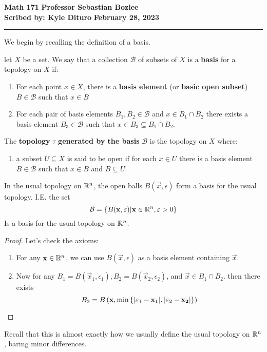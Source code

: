 \documentclass[12pt, twosided]{article}
\begin{document}
\noindent \textbf{Math 171} \hfill \textbf{Professor Sebastian Bozlee} \\
\textbf{Scribed by: Kyle Dituro} \hfill \textbf{February 28, 2023}\hrule
\vspace{.2in}

We begin by recalling the definition of a basis.

\begin{df}
  let \(X\) be a set. We say that a collection \(\mathcal{B}\) of subsets of \(X\) is a \textbf{basis} for a topology on \(X\) if:
  \begin{enumerate}
  \item For each point \(x\in X\), there is a \textbf{basis element} (or \textbf{basic open subset}) \(B \in \mathcal{B}\) such that \(x \in B\)
  \item For each pair of basis elements \(B_1, B_2 \in \mathcal{B}\) and \(x \in B_1 \cap B_2\) there exists a basis element \(B_3 \in \mathcal{B}\) such that \(x \in B_3 \subseteq B_1 \cap B_2\).
  \end{enumerate}

  The \textbf{topology} \(\tau\) \textbf{generated by the basis} \(\mathcal{B}\) is the topology on \(X\) where:
  \begin{enumerate}
  \item a subset \(U \subseteq X\) is said to be open if for each \(x \in U\) there is a basis element \(B \in \mathcal{B}\) such that \(x \in B\) and \(B \subseteq U\).
  \end{enumerate}
\end{df}

\begin{exa}
  In the usual topology on \(\mathbb{R}^n\), the open balls \(B(\vec{x}, \epsilon)\) form a basis for the usual topology. I.E. the set
  \[\mathcal{B} = \left\{ B(\mathbf{x}, \varepsilon) \middle\vert \mathbf{x} \in \mathbb{R}^n, \varepsilon > 0 \right\}\] Is a basis for the usual topology on \(\mathbb{R}^n\).

  \begin{proof}
    Let's check the axioms:

    \begin{enumerate}
    \item For any \(\mathbf{x} \in \mathbb{R}^n\), we can use \(B(\vec{x}, \epsilon)\) as a basis element containing \(\vec{x}\).
    \item Now for any \(B_1 = B(\vec{x}_1, \epsilon_1), B_2 = B(\vec{x}_2, \epsilon_2)\), and \(\vec{x} \in B_1 \cap B_2\). then there exists \[B_3 = B\left(\mathbf{x}, \min \left\{ |\varepsilon_1 - \mathbf{x_1}|, |\varepsilon_2 - \mathbf{x_2}| \right\}\right)\]
    \end{enumerate}
  \end{proof}

  Recall that this is almost exactly how we usually define the usual topology on \(\mathbb{R}^n\), baring minor differences.
\end{exa}
\end{document}
